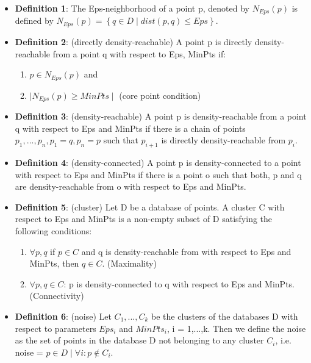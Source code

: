 \begin{itemize}
	\item \textbf{Definition 1}: The Eps-neighborhood of a point p, denoted by $N_{Eps}(p)$ is defined by $N_{Eps}(p) = \left\{q\in D\mid dist(p,q)\leq Eps\right\}$.
	
	\item \textbf{Definition 2}: (directly density-reachable) A point p is directly density-reachable from a point q with respect to Eps, MinPts if:
	
	\begin{enumerate}
		\item $p \in N_{Eps}(p)$ and
		\item $\mid N_{Eps}(p) \geq MinPts \mid$ (core point condition)
	\end{enumerate}
	
	\item \textbf{Definition 3}: (density-reachable) A point p is density-reachable from a point q with respect to Eps and MinPts if there is a chain of points $p_{1},...,p_{n}, p_{1} = q,p_{n}=p$ such that $p_{i+1}$ is directly density-reachable from $p_{i}$.
	
	\item \textbf{Definition 4}: (density-connected) A point p is density-connected to a point with respect to Eps and MinPts if there is a point o such that both, p and q are density-reachable from o with respect to Eps and MinPts.
	
	\item \textbf{Definition 5}: (cluster) Let D be a database of points. A cluster C with respect to Eps and MinPts is a non-empty subset of D satisfying the following conditions:
	
	\begin{enumerate}
		\item $\forall p,q$ if $p \in C$ and q is density-reachable from with respect to Eps and MinPts, then $q \in C$. (Maximality)
		\item $\forall p,q \in C$: p is density-connected to q with respect to Eps and MinPts. (Connectivity)
	\end{enumerate}	
	
	\item \textbf{Definition 6}: (noise) Let $C_{1},...,C_{k}$ be the clusters of the databases D with respect to parameters $Eps_{i}$ and $MinPts_{i}$, i = 1,...,k. Then we define the noise as the set of points in the database D not belonging to any cluster $C_{i}$, i.e. noise = ${p \in D \mid \forall i: p \notin C_{i}}$.
\end{itemize}

